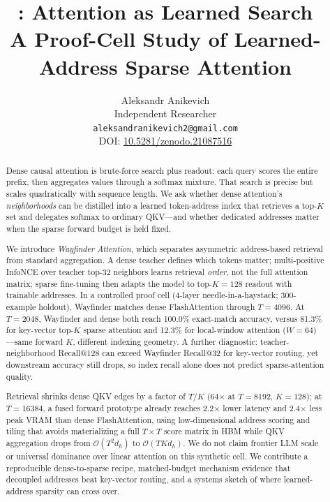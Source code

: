 \documentclass{article}
\title{\methodname: Attention as Learned Search\\[0.25em]\large A Proof-Cell Study of Learned-Address Sparse Attention}
\author{
  Aleksandr Anikevich \\
  Independent Researcher \\
  \texttt{aleksandranikevich2@gmail.com} \\
  \small DOI: \href{https://doi.org/10.5281/zenodo.21087516}{10.5281/zenodo.21087516}
}
\begin{document}
\maketitle

\begin{abstract}
Dense causal attention is brute-force search plus readout: each query scores the entire prefix, then aggregates values through a softmax mixture. That search is precise but scales quadratically with sequence length. We ask whether dense attention's \emph{neighborhoods} can be distilled into a learned token-address index that retrieves a top-$K$ set and delegates softmax to ordinary QKV---and whether dedicated addresses matter when the sparse forward budget is held fixed.

We introduce \emph{Wayfinder Attention}, which separates asymmetric address-based retrieval from standard aggregation. A dense teacher defines which tokens matter; multi-positive InfoNCE over teacher top-32 neighbors learns retrieval \emph{order}, not the full attention matrix; sparse fine-tuning then adapts the model to top-$K{=}128$ readout with trainable addresses. In a controlled proof cell (4-layer needle-in-a-haystack; 300-example holdout), Wayfinder matches dense FlashAttention through $T{=}4096$. At $T{=}2048$, Wayfinder and dense both reach 100.0\% exact-match accuracy, versus 81.3\% for key-vector top-$K$ sparse attention and 12.3\% for local-window attention ($W{=}64$)---same forward $K$, different indexing geometry. A further diagnostic: teacher-neighborhood Recall@128 can exceed Wayfinder Recall@32 for key-vector routing, yet downstream accuracy still drops, so index recall alone does not predict sparse-attention quality.

Retrieval shrinks dense QKV edges by a factor of $T/K$ (64$\times$ at $T{=}8192$, $K{=}128$); at $T{=}16384$, a fused forward prototype already reaches 2.2$\times$ lower latency and 2.4$\times$ less peak VRAM than dense FlashAttention, using low-dimensional address scoring and tiling that avoids materializing a full $T \times T$ score matrix in HBM while QKV aggregation drops from $\mathcal{O}(T^2 d_h)$ to $\mathcal{O}(TK d_h)$. We do not claim frontier LLM scale or universal dominance over linear attention on this synthetic cell. We contribute a reproducible dense-to-sparse recipe, matched-budget mechanism evidence that decoupled addresses beat key-vector routing, and a systems sketch of where learned-address sparsity can cross over.
\end{abstract}
\end{document}
